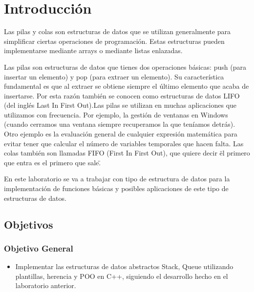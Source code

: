 \section{Introducción}

Las pilas y colas son estructuras de datos que se utilizan generalmente para simplificar ciertas operaciones de programación. Estas estructuras pueden implementarse mediante arrays o mediante listas enlazadas. 

Las pilas son estructuras de datos que tienes dos operaciones básicas: push (para insertar un elemento) y pop (para extraer un elemento). Su característica fundamental es que al extraer se obtiene siempre el último elemento que acaba de insertarse. Por esta razón también se conocen como estructuras de datos LIFO (del inglés Last In First Out).Las pilas se utilizan en muchas aplicaciones que utilizamos con frecuencia. Por ejemplo, la gestión de ventanas en Windows (cuando cerramos una ventana siempre recuperamos la que teníamos detrás). Otro ejemplo es la evaluación general de cualquier expresión matemática para evitar tener que calcular el número de variables temporales que hacen falta. Las colas también son llamadas FIFO (First In First Out), que quiere decir \"el primero que entra es el primero que sale\". \cite{R3} 

En este laboratorio se va a trabajar con tipo de estructura de datos para la implementación de funciones básicas y posibles aplicaciones de este tipo de estructuras de datos.

\subsection{Objetivos}



\subsubsection{Objetivo General}
\begin{itemize}
\item Implementar las estructuras de datos abstractos Stack, Queue utilizando plantillas, herencia y POO en C++, siguiendo el desarrollo hecho en el laboratorio anterior.
\end{itemize}

